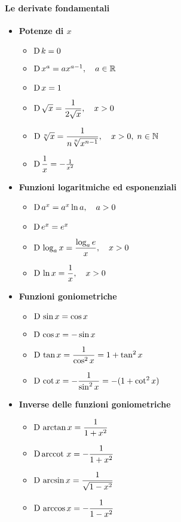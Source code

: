 \documentclass{article}
\theoremstyle{plain}
\theoremstyle{definition}
\theoremstyle{remark}
\begin{document}
\paragraph{Le derivate fondamentali}
\begin{multicols}{2}
\begin{itemize}
    \item[] \textbf{Potenze di $x$}
    \begin{itemize}
        \item[] $\textup{D}\,k=0$
        \item[] $\textup{D}\,x^a=ax^{a-1},\quad a\in\mathbb{R}$
        \item[] $\textup{D}\,x=1$
        \item[] $\textup{D}\,\sqrt{x}=\dfrac{1}{2\sqrt{x}},\quad x>0$
        \item[] $\textup{D}\,\sqrt[n]{x}=\dfrac{1}{n\sqrt[n]{x^{n-1}}},\quad x>0,\; n\in\mathbb{N}$
        \item[] $\textup{D}\,\dfrac{1}{x}=-\frac{1}{x^2}$
    \end{itemize}
    \item[] \textbf{Funzioni logaritmiche ed esponenziali}
    \begin{itemize}
        \item[] $\textup{D}\,a^x=a^x\ln a,\quad a>0$
        \item[] $\textup{D}\,e^x=e^x$
        \item[] $\textup{D}\,\log_ax=\dfrac{\log_ae}{x},\quad x>0$
        \item[] $\textup{D}\,\ln x=\dfrac{1}{x},\quad x>0$
    \end{itemize}
    \columnbreak
    \item[] \textbf{Funzioni goniometriche}
    \begin{itemize}
        \item[] $\textup{D}\,\sin x=\cos x$
        \item[] $\textup{D}\,\cos x=-\sin x$
        \item[] $\textup{D}\,\tan x=\dfrac{1}{\cos^2x}=1+\tan^2x$
        \item[] $\textup{D}\,\cot x=-\dfrac{1}{\sin^2x}=-(1+\cot^2x)$
    \end{itemize}
    \item[] \textbf{Inverse delle funzioni goniometriche}
    \begin{itemize}
        \item[] $\textup{D}\,\arctan x=\dfrac{1}{1+x^2}$
        \item[] $\textup{D}\,\textup{arccot }x=-\dfrac{1}{1+x^2}$
        \item[] $\textup{D}\,\arcsin x=\dfrac{1}{\sqrt{1-x^2}}$
        \item[] $\textup{D}\,\arccos x=-\dfrac{1}{1-x^2}$
    \end{itemize}
\end{itemize}
\end{multicols}
\end{document}

